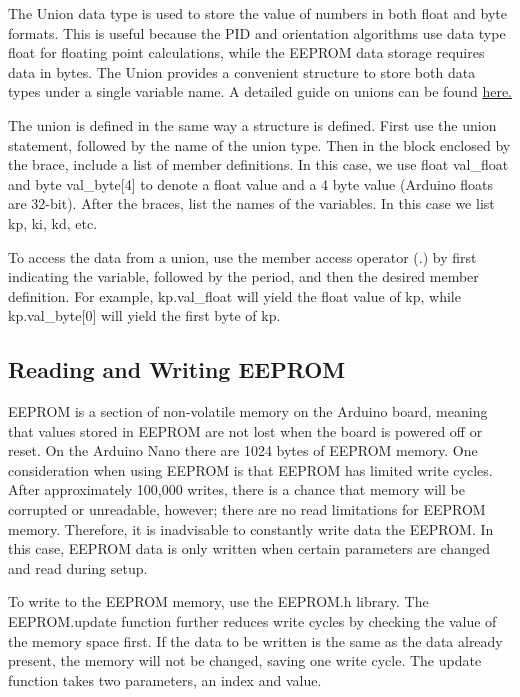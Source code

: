 \documentclass[11pt]{article} %
\begin{document}
The Union data type is used to store the value of numbers in both float and byte formats. This is useful because the PID and orientation algorithms use data type float for floating point calculations, while the EEPROM data storage requires data in bytes. The Union provides a convenient structure to store both data types under a single variable name. A detailed guide on unions can be found \href{https://www.tutorialspoint.com/cprogramming/c_unions.htm}{here.}



The union is defined in the same way a structure is defined. First use the union statement, followed by the name of the union type. Then in the block enclosed by the brace, include a list of member definitions. In this case, we use float val\_float and byte val\_byte[4] to denote a float value and a 4 byte value (Arduino floats are 32-bit). After the braces, list the names of the variables. In this case we list kp, ki, kd, etc. 

To access the data from a union, use the member access operator (.) by first indicating the variable, followed by the period, and then the desired member definition. For example, kp.val\_float will yield the float value of kp, while kp.val\_byte[0] will yield the first byte of kp. 


\subsection{Reading and Writing EEPROM}

EEPROM is a section of non-volatile memory on the Arduino board, meaning that values stored in EEPROM are not lost when the board is powered off or reset. On the Arduino Nano there are 1024 bytes of EEPROM memory. One consideration when using EEPROM is that EEPROM has limited write cycles. After approximately 100,000 writes, there is a chance that memory will be corrupted or unreadable, however; there are no read limitations for EEPROM memory. Therefore, it is inadvisable to constantly write data the EEPROM. In this case, EEPROM data is only written when certain parameters are changed and read during setup. 

To write to the EEPROM memory, use the EEPROM.h library. The EEPROM.update function further reduces write cycles by checking the value of the memory space first. If the data to be written is the same as the data already present, the memory will not be changed, saving one write cycle. The update function takes two parameters, an index and value. 
\end{document}
